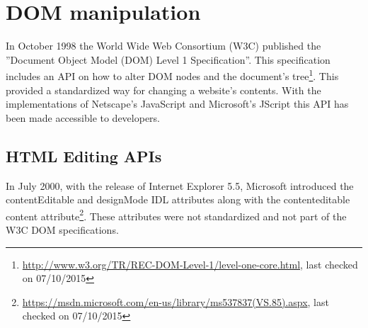 \chapter{DOM manipulation}

In October 1998 the World Wide Web Consortium (W3C) published the ''Document Object Model (DOM) Level 1 Specification''. This specification includes an API on how to alter DOM nodes and the document's tree\footnote{\url{http://www.w3.org/TR/REC-DOM-Level-1/level-one-core.html}, last checked on 07/10/2015}. This provided a standardized way for changing a website's contents. With the implementations of Netscape's JavaScript and Microsoft's JScript this API has been made accessible to developers.

\section{HTML Editing APIs}

In July 2000, with the release of Internet Explorer 5.5, Microsoft introduced the contentEditable and designMode IDL attributes along with the contenteditable content attribute\footnote{\url{https://msdn.microsoft.com/en-us/library/ms537837(VS.85).aspx}, last checked on 07/10/2015}. These attributes were not standardized and not part of the W3C DOM specifications. 

\begin{table}[]
\centering
{}
\caption{My caption}
\label{my-label}
\end{table}

